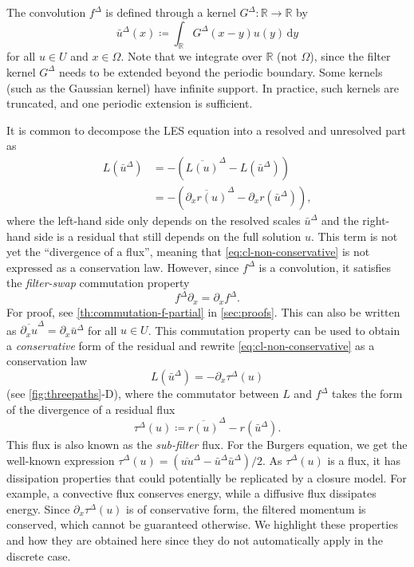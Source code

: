 \documentclass[preprint,twocolumn,5p]{elsarticle}
\begin{document}
The convolution $f^\Delta$ is defined through a kernel
$G^\Delta : \mathbb{R} \to \mathbb{R}$ by
\begin{equation} \label{eq:convolution}
    \bar{u}^\Delta(x) \coloneq \int_\mathbb{R} G^\Delta(x - y) u(y) \, \mathrm{d} y
\end{equation}
for all $u \in U$ and $x \in \Omega$.
Note that we integrate over $\mathbb{R}$ (not $\Omega$), since the filter
kernel $G^\Delta$ needs to be extended beyond the periodic boundary.
Some kernels (such as the Gaussian kernel) have infinite support.
In practice, such kernels are truncated, and one periodic extension
is sufficient.

It is common to decompose the LES equation into a resolved and
unresolved part as
\begin{equation} \label{eq:cl-non-conservative}
\begin{split}
    L(\bar{u}^\Delta)
    & = -\left( \overline{L(u)}^\Delta - L(\bar{u}^\Delta) \right) \\
    & = -\left(\overline{\partial_x r(u)}^\Delta - \partial_x r(\bar{u}^\Delta)\right),
\end{split}
\end{equation}
where the left-hand side only depends on the resolved scales $\bar{u}^\Delta$
and the right-hand side is a residual that still depends on the full
solution $u$.
This term is not yet the ``divergence of a flux'', meaning that
\eqref{eq:cl-non-conservative} is not expressed as a conservation law.
However, since $f^\Delta$ is a convolution,
it satisfies the \emph{filter-swap} commutation property
\begin{equation} \label{eq:continuous-commutation}
    f^\Delta \partial_x = \partial_x f^\Delta.
\end{equation}
For proof, see \cref{th:commutation-f-partial} in \ref{sec:proofs}.
This can also be written as
$\overline{\partial_x u}^\Delta = \partial_x \bar{u}^\Delta$ for all $u \in U$.
This commutation property can be used to
obtain a \emph{conservative} form
of the residual and rewrite \cref{eq:cl-non-conservative}
as a conservation law
\begin{equation} \label{eq:les}
    L(\bar{u}^\Delta) = -\partial_x \tau^\Delta(u)
\end{equation}
(see \cref{fig:threepaths}-D),
where the commutator between $L$ and $f^\Delta$ takes the form of the
divergence of a residual flux
\begin{equation}
    \boxed{\tau^\Delta(u) \coloneq \overline{r(u)}^\Delta - r(\bar{u}^\Delta)}.
\end{equation}
This flux is also known as the \emph{sub-filter} flux.
For the Burgers equation, we get the well-known expression
$\tau^\Delta(u) = (\overline{u u}^\Delta - \bar{u}^\Delta \bar{u}^\Delta) / 2$.
As $\tau^\Delta(u)$ is a flux,
it has dissipation properties that could potentially be replicated by a
closure model.
For example, a convective flux conserves energy, while a diffusive flux
dissipates energy. Since $\partial_x \tau^\Delta(u)$ is of conservative form, 
the filtered momentum is conserved,
which cannot be guaranteed otherwise.
We highlight these properties and how they are obtained here since they do not
automatically apply in the discrete case.
\end{document}
